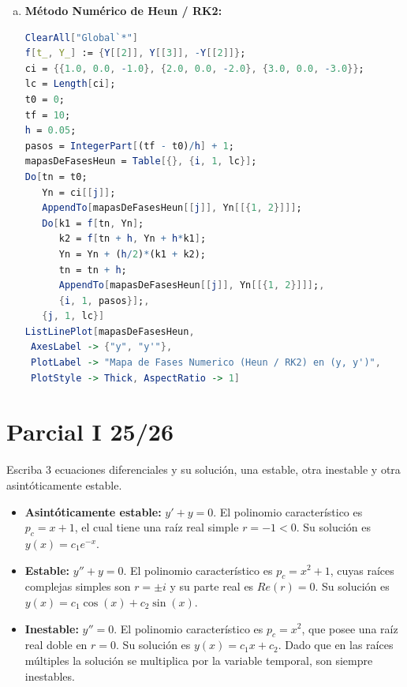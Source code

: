 \begin{sol}
\begin{enumerate}[a)]
    \item \textbf{Método Numérico de Heun / RK2:}
\begin{lstlisting}[language=Mathematica]
ClearAll["Global`*"]
f[t_, Y_] := {Y[[2]], Y[[3]], -Y[[2]]};
ci = {{1.0, 0.0, -1.0}, {2.0, 0.0, -2.0}, {3.0, 0.0, -3.0}};
lc = Length[ci];
t0 = 0;
tf = 10;
h = 0.05;
pasos = IntegerPart[(tf - t0)/h] + 1;
mapasDeFasesHeun = Table[{}, {i, 1, lc}];
Do[tn = t0;
   Yn = ci[[j]];
   AppendTo[mapasDeFasesHeun[[j]], Yn[[{1, 2}]]];
   Do[k1 = f[tn, Yn];
      k2 = f[tn + h, Yn + h*k1];
      Yn = Yn + (h/2)*(k1 + k2);
      tn = tn + h;
      AppendTo[mapasDeFasesHeun[[j]], Yn[[{1, 2}]]];, 
      {i, 1, pasos}];, 
   {j, 1, lc}]
ListLinePlot[mapasDeFasesHeun, 
 AxesLabel -> {"y", "y'"}, 
 PlotLabel -> "Mapa de Fases Numerico (Heun / RK2) en (y, y')", 
 PlotStyle -> Thick, AspectRatio -> 1]
\end{lstlisting}
\end{enumerate}
\end{sol}

\chapter{Parcial I 25/26}
\begin{ejer}[1]
Escriba 3 ecuaciones diferenciales y su solución, una estable, otra inestable y otra asintóticamente estable.
\end{ejer}
\begin{sol}
\begin{itemize}
    \item \textbf{Asintóticamente estable:} $y' + y = 0$.
    El polinomio característico es $p_c = x + 1$, el cual tiene una raíz real simple $r = -1 < 0$.
    Su solución es $y(x) = c_1 e^{-x}$.
    \item \textbf{Estable:} $y'' + y = 0$.
    El polinomio característico es $p_c = x^2 + 1$, cuyas raíces complejas simples son $r = \pm i$ y su parte real es $Re(r) = 0$.
    Su solución es $y(x) = c_1 \cos(x) + c_2 \sin(x)$.
    \item \textbf{Inestable:} $y'' = 0$.
    El polinomio característico es $p_c = x^2$, que posee una raíz real doble en $r = 0$.
    Su solución es $y(x) = c_1 x + c_2$. Dado que en las raíces múltiples la solución se multiplica por la variable temporal, son siempre inestables.
\end{itemize}
\end{sol}

\vspace{0.5cm}

